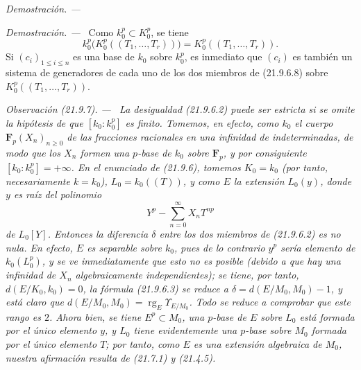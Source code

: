 \documentclass[10pt,oneside]{book}
\makeatletter
\newcommand{\setmanualcurrentlabel}[1]{\def\@currentlabel{#1}}
\newenvironment{remark}[1][]{%
  \setmanualcurrentlabel{#1}\par\medskip\noindent\itshape Observación (#1). ---\ }{\par}
\newenvironment{proof}{%
  \par\medskip\noindent\textit{Demostración. ---\ }}{\par}
\makeatother
\begin{document}
\begin{proof}
\begin{enumerate}
  \begin{proof}
  Como $k_0^p\subset K_0^p$, se tiene
  \[
    k_0^p\bigl(K_0^p((T_1,\ldots,T_r))\bigr)
    =K_0^p((T_1,\ldots,T_r)).
  \]
  Si $(c_i)_{1\leqslant i\leqslant n}$ es una base de $k_0$ sobre $k_0^p$,
  es inmediato que $(c_i)$ es también un sistema de generadores de cada uno
  de los dos miembros de (21.9.6.8) sobre
  $K_0^p((T_1,\ldots,T_r))$.
  \end{proof}
\end{enumerate}
\end{proof}

\begin{remark}[21.9.7]
\label{0.21.9.7-es}
La desigualdad (21.9.6.2) puede ser estricta si se omite la hipótesis de que
$[k_0:k_0^p]$ es finito. Tomemos, en efecto, como $k_0$ el cuerpo
$\mathbf F_p(X_n)_{n\geqslant0}$ de las fracciones racionales en una infinidad
de indeterminadas, de modo que los $X_n$ formen una $p$-base de $k_0$ sobre
$\mathbf F_p$, y por consiguiente $[k_0:k_0^p]=+\infty$. En el enunciado de
(21.9.6), tomemos $K_0=k_0$ (por tanto, necesariamente $k=k_0$),
$L_0=k_0((T))$, y como $E$ la extensión $L_0(y)$, donde $y$ es raíz del
polinomio
\[
  Y^p-\sum_{n=0}^{\infty}X_nT^{np}
\]
de $L_0[Y]$. Entonces la diferencia $\delta$ entre los dos miembros de
(21.9.6.2) es \emph{no nula}. En efecto, $E$ es \emph{separable} sobre $k_0$,
pues de lo contrario $y^p$ sería elemento de $k_0(L_0^p)$, y se ve
inmediatamente que esto no es posible (debido a que hay una infinidad de
$X_n$ algebraicamente independientes); se tiene, por tanto,
$d(E/K_0,k_0)=0$, la fórmula (21.9.6.3) se reduce a
$\delta=d(E/M_0,M_0)-1$, y está claro que
$d(E/M_0,M_0)=\operatorname{rg}_E\Upsilon_{E/M_0}$. Todo se reduce a comprobar
que este rango es $2$. Ahora bien, se tiene $E^p\subset M_0$, una $p$-base de
$E$ sobre $L_0$ está formada por el único elemento $y$, y $L_0$ tiene
evidentemente una $p$-base sobre $M_0$ formada por el único elemento $T$; por
tanto, como $E$ es una extensión algebraica de $M_0$, nuestra afirmación
resulta de (21.7.1) y (21.4.5).
\end{remark}
\end{document}
